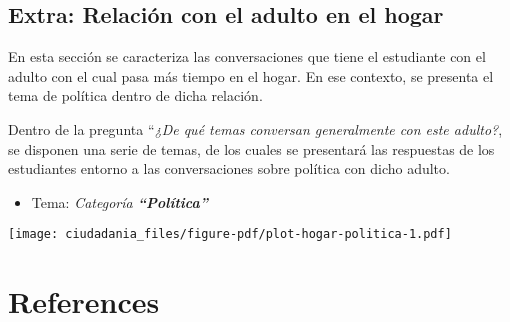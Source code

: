 \documentclass[
  letterpaper,
  DIV=11,
  numbers=noendperiod]{scrreprt}
\providecommand{\tightlist}{%
  \setlength{\itemsep}{0pt}\setlength{\parskip}{0pt}}\usepackage{longtable,booktabs,array}
\newlength{\cslhangindent}
\newenvironment{CSLReferences}[2] %
 {\begin{list}{}{%
  \setlength{\itemindent}{0pt}
  \setlength{\leftmargin}{0pt}
  \setlength{\parsep}{0pt}
  \ifodd #1
   \setlength{\leftmargin}{\cslhangindent}
   \setlength{\itemindent}{-1\cslhangindent}
  \fi
  \setlength{\itemsep}{#2\baselineskip}}}
 {\end{list}}
\begin{document}
\section{Extra: Relación con el adulto en el
hogar}\label{extra-relaciuxf3n-con-el-adulto-en-el-hogar}

En esta sección se caracteriza las conversaciones que tiene el
estudiante con el adulto con el cual pasa más tiempo en el hogar. En ese
contexto, se presenta el tema de política dentro de dicha relación.

Dentro de la pregunta ``\emph{¿De qué temas conversan generalmente con
este adulto?}, se disponen una serie de temas, de los cuales se
presentará las respuestas de los estudiantes entorno a las
conversaciones sobre política con dicho adulto.

\begin{itemize}
\tightlist
\item
  Tema: \emph{Categoría \textbf{``Política''}}
\end{itemize}

\texttt{[image: ciudadania\_files/figure-pdf/plot-hogar-politica-1.pdf]}


\chapter*{References}\label{references}


\label{refs}
\begin{CSLReferences}{0}{1}
\end{CSLReferences}
\end{document}
